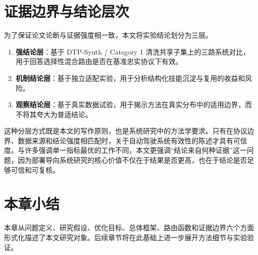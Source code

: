\section{证据边界与结论层次}
\label{sec:problem-evidence}

为了保证论文论断与证据强度相一致，本文将实验结论划分为三层。

\begin{enumerate}
  \item \textbf{强结论层}：基于 DTP-Synth / Category 1 清洗共享子集上的三路系统对比，用于回答选择性混合路由是否在基准忠实协议下有效。
  \item \textbf{机制结论层}：基于独立适配实验，用于分析结构化技能沉淀与复用的收益和风险。
  \item \textbf{观察结论层}：基于真实数据试验，用于揭示方法在真实分布中的适用边界，而不将其夸大为普适结论。
\end{enumerate}

这种分层方式既是本文的写作原则，也是系统研究中的方法学要求。只有在协议边界、数据来源和结论强度相匹配时，关于自动驾驶系统有效性的陈述才具有可信度。与许多强调单一指标最优的工作不同，本文更强调“结论来自何种证据”这一问题，因为部署导向系统研究的核心价值不仅在于结果是否更高，也在于结论是否足够可信和可复核。

\section{本章小结}
\label{sec:problem-summary}

本章从问题定义、研究假设、优化目标、总体框架、路由函数和证据边界六个方面形式化描述了本文研究对象。后续章节将在此基础上进一步展开方法细节与实验验证。
